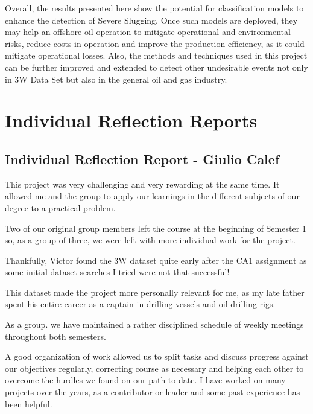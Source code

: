 \documentclass{article}
\begin{document}
Overall, the results presented here show the potential for classification models to enhance the detection of Severe Slugging. Once such models are deployed, they may help an offshore oil operation to mitigate operational and environmental risks, reduce costs in operation and improve the production efficiency, as it could mitigate operational losses. Also, the methods and techniques used in this project can be further improved and extended to detect other undesirable events not only in 3W Data Set but also in the general oil and gas industry.

\nocite{*}

\printbibliography

\appendix
\section{Individual Reflection Reports}
\subsection{Individual Reflection Report - Giulio Calef}
This project was very challenging and very rewarding at the same time. It allowed me and the group to apply our learnings in the different subjects of our degree to a practical problem.

Two of our original group members left the course at the beginning of Semester 1 so, as a group of three, we were left with more individual work for the project.

Thankfully, Victor found the 3W dataset quite early after the CA1 assignment as some initial dataset searches I tried were not that successful!

This dataset made the project more personally relevant for me, as my late father spent his entire career as a captain in drilling vessels and oil drilling rigs.

As a group. we have maintained a rather disciplined schedule of weekly meetings throughout both semesters.

A good organization of work allowed us to split tasks and discuss progress against our objectives regularly, correcting course as necessary and helping each other to overcome the hurdles we found on our path to date. I have worked on many projects over the years, as a contributor or leader and some past experience has been helpful.
\end{document}
